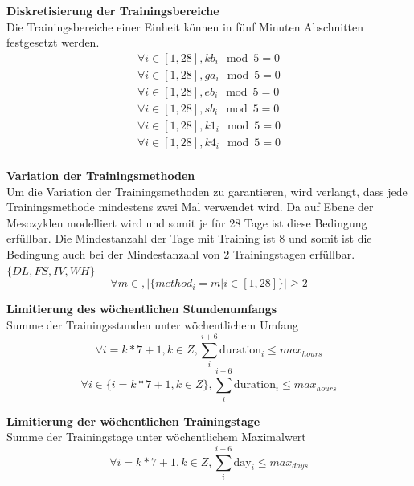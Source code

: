 \textbf{Diskretisierung der Trainingsbereiche} \\[0.2em]
Die Trainingsbereiche einer Einheit können in fünf Minuten Abschnitten festgesetzt werden.
\begin{equation}
\begin{array}{c}
    \forall i \in [1, 28], kb_i \mod 5 = 0 \\
    \forall i \in [1, 28], ga_i \mod 5 = 0 \\
    \forall i \in [1, 28], eb_i \mod 5 = 0 \\
    \forall i \in [1, 28], sb_i \mod 5 = 0 \\
    \forall i \in [1, 28], k1_i \mod 5 = 0 \\
    \forall i \in [1, 28], k4_i \mod 5 = 0 \\
\end{array}
\end{equation}

\textbf{Variation der Trainingsmethoden} \\[0.2em]
Um die Variation der Trainingsmethoden zu garantieren, wird verlangt, dass jede Trainingsmethode mindestens zwei Mal verwendet wird. Da auf Ebene der Mesozyklen modelliert wird und somit je für 28 Tage ist diese Bedingung erfüllbar. Die Mindestanzahl der Tage mit Training ist 8 und somit ist die Bedingung auch bei der Mindestanzahl von 2 Trainingstagen erfüllbar. $\{DL, FS, IV, WH\}$
\begin{equation} 
    \forall m \in ,|\{method_i = m | i \in [1, 28]\}| \geq 2
\end{equation} 

\textbf{Limitierung des wöchentlichen Stundenumfangs} \\[0.2em]
Summe der Trainingsstunden unter wöchentlichem Umfang
\begin{equation}
    \forall i = k * 7 + 1, k \in Z, \sum_{i}^{i+6} \text{duration}_i \leq max_{hours} 
\end{equation}
\begin{equation}
    \forall i \in \{ i = k * 7 + 1, k \in Z \}, \sum_{i}^{i+6} \text{duration}_i \leq max_{hours}
\end{equation}

\textbf{Limitierung der wöchentlichen Trainingstage} \\[0.2em]
Summe der Trainingstage unter wöchentlichem Maximalwert
\begin{equation}
    \forall i = k * 7 + 1, k \in Z, \sum_{i}^{i+6} \text{day}_i \leq max_{days}
\end{equation}

